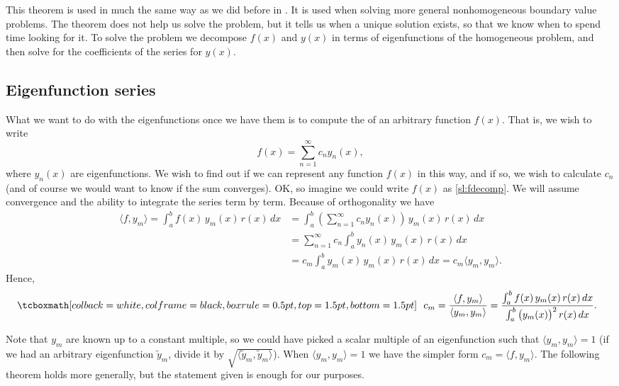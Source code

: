 This theorem is used in much the same way as we did before in
.  It is used when solving more general nonhomogeneous
boundary value problems.  The theorem does not help us solve the problem, but
it tells us when a unique solution exists, so
that we know when to spend time looking for it.  To solve the problem
we decompose $f(x)$ and $y(x)$ in terms of eigenfunctions of the
homogeneous
problem, and then solve for the coefficients of the series for $y(x)$.

\subsection{Eigenfunction series}

What we want to do with the eigenfunctions once we have them is to
compute the \emph{} of an arbitrary
function $f(x)$.  That is, we wish to write
\begin{equation} \label{sl:fdecomp}
f(x) = \sum_{n=1}^\infty c_n y_n(x) ,
\end{equation}
where $y_n(x)$ are eigenfunctions.
We wish to find out if we can represent
any function $f(x)$ in this way,
and if so, we wish to calculate $c_n$ (and of course we would want to know if
the sum converges).  OK\@, so imagine
we could write $f(x)$ as \eqref{sl:fdecomp}.  We will assume convergence and
the ability to integrate the series term by term.
Because of orthogonality we have
\begin{equation*}
\begin{split}
\langle f , y_m \rangle
 = \int_a^b f(x) \, y_m (x) \, r(x) \, dx
& = \int_a^b \left( \sum_{n=1}^\infty c_n y_n(x) \right) \, y_m (x) \, r(x)
\, dx\\
&= \sum_{n=1}^\infty c_n \int_a^b y_n(x) \, y_m (x) \, r(x) \, dx\\
&= c_m \int_a^b y_m(x) \, y_m (x) \, r(x) \, dx = c_m \langle y_m , y_m \rangle
.
\end{split}
\end{equation*}
Hence,
\begin{equation} \label{sl:cm}
\mybxbg{~~
c_m = \frac{\langle f , y_m \rangle}{\langle y_m , y_m \rangle}
=
\frac{\int_a^b f(x) \, y_m (x)\, r(x) \, dx}%
{\int_a^b {\bigl(y_m(x)\bigr)}^2 \, r(x) \,dx} .
~~}
\end{equation}

Note that $y_m$ are known up to a constant multiple, so we could have picked
a scalar multiple of an eigenfunction such that
$\langle y_m , y_m \rangle = 1$ (if we had an arbitrary eigenfunction
$\tilde{y}_m$, divide it
by $\sqrt{\langle \tilde{y}_m , \tilde{y}_m \rangle}$).
When
$\langle y_m , y_m \rangle = 1$
we have the
simpler form $c_m = \langle f, y_m \rangle$.
The following theorem holds
more generally, but the statement given is enough for our purposes.

